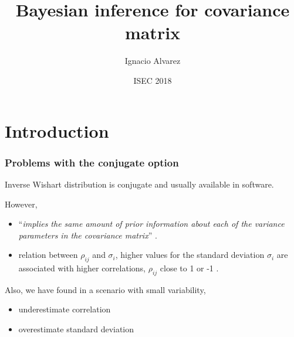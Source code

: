 \documentclass[9pt]{beamer}\usepackage[]{graphicx}\usepackage[]{color}
\title{Bayesian inference for covariance matrix}
\author[Ignacio Alvarez-Castro]{Ignacio Alvarez}
\institute[IESTA]{IESTA, Universidad de la República, Uruguay}
\date{ISEC 2018}
\begin{document}
 \frame{\titlepage}
 
 \section{Introduction}
\AtBeginSection[] { 
  \begin{frame}[plain]  
    \tableofcontents[currentsection] 
  \end{frame} 
  \addtocounter{framenumber}{-1} 
} 



\begin{frame}
\frametitle{Problems with the conjugate option}
Inverse Wishart distribution is conjugate and usually available in software. 

However,
\begin{itemize}
\item  ``\textit{implies the same amount of prior information about each of the variance parameters in the covariance matrix}'' \citep{bda2003}.  
\item  relation between $\rho_{ij}$ and $\sigma_i$, higher values for the standard deviation $\sigma_i$ are associated with higher correlations, $\rho_{ij}$ close to 1 or -1 \citep{visualize}. 
\end{itemize}
\vspace{.5cm}

Also, we have found in a scenario with small variability,
\begin{itemize}
\item underestimate correlation
\item overestimate standard deviation
\end{itemize}
\end{frame}
\end{document}
